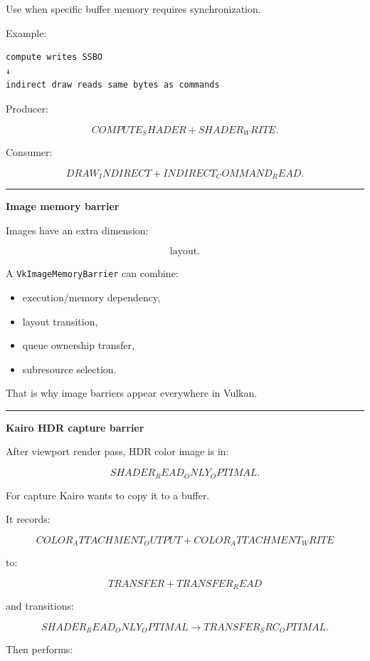 Use when specific buffer memory requires synchronization.

Example:

\begin{verbatim}
compute writes SSBO
↓
indirect draw reads same bytes as commands
\end{verbatim}

Producer:

\[
COMPUTE_SHADER
+
SHADER_WRITE.
\]

Consumer:

\[
DRAW_INDIRECT
+
INDIRECT_COMMAND_READ.
\]

\begin{center}\rule{0.5\linewidth}{0.5pt}\end{center}

\textbf{Image memory barrier}

Images have an extra dimension:

\[
\boxed{\text{layout}.}
\]

A \texttt{VkImageMemoryBarrier} can combine:

\begin{itemize}
\tightlist
\item
  execution/memory dependency,
\item
  layout transition,
\item
  queue ownership transfer,
\item
  subresource selection.
\end{itemize}

That is why image barriers appear everywhere in Vulkan.

\begin{center}\rule{0.5\linewidth}{0.5pt}\end{center}

\textbf{Kairo HDR capture barrier}

After viewport render pass, HDR color image is in:

\[
SHADER_READ_ONLY_OPTIMAL.
\]

For capture Kairo wants to copy it to a buffer.

It records:

\[
COLOR_ATTACHMENT_OUTPUT
+
COLOR_ATTACHMENT_WRITE
\]

to:

\[
TRANSFER
+
TRANSFER_READ
\]

and transitions:

\[
SHADER_READ_ONLY_OPTIMAL
\rightarrow
TRANSFER_SRC_OPTIMAL.
\]

Then performs:

